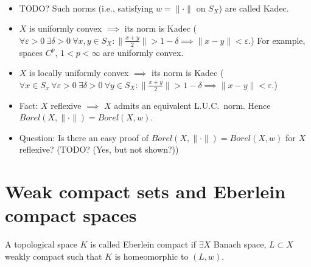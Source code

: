 \documentclass[12pt]{article}					%
\begin{document}
\begin{poznamka}
	\ 
	\begin{itemize}
		\item TODO? Such norms (i.e., satisfying $w = \|·\|$ on $S_X$) are called Kadec.
		\item $X$ is uniformly convex $\implies$ its norm is Kadec ($\forall ε > 0\ \exists δ > 0\ \forall x, y \in S_X: \|\frac{x + y}{2}\| > 1 - δ \implies \|x - y\| < ε$.) For example, spaces $C^p$, $1 < p < ∞$ are uniformly convex.
		\item $X$ is locally uniformly convex $\implies$ its norm is Kadec ($\forall x \in S_x\ \forall ε > 0\ \exists δ > 0\ \forall y \in S_X: \|\frac{x + y}{2}\| > 1 - δ \implies \|x - y\| < ε$.)
		\item Fact: $X$ reflexive $\implies$ $X$ admits an equivalent L.U.C.~norm. Hence $Borel(X, \|·\|) = Borel(X, w)$.
		\item Question: Is there an easy proof of $Borel(X, \|·\|) = Borel(X, w)$ for $X$ reflexive? (TODO? (Yes, but not shown?))
	\end{itemize}
\end{poznamka}

\section{Weak compact sets and Eberlein compact spaces}
\begin{definice}
	A topological space $K$ is called Eberlein compact if $\exists X$ Banach space, $L \subset X$ weakly compact such that $K$ is homeomorphic to $(L, w)$.
\end{definice}
\end{document}
